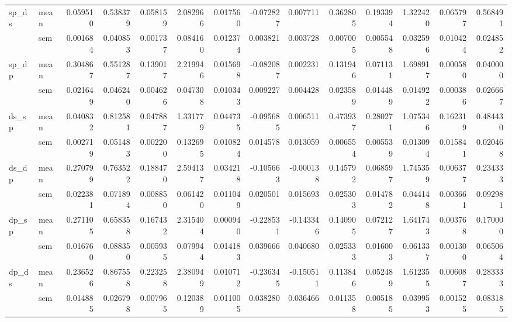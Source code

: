 \begin{tabular}{llrrrrrrrrrrrr}
\cline{1-14}
\multirow[t]{2}{*}{sp_ds} & mean & 0.059510 & 0.538379 & 0.058159 & 2.082966 & 0.017560 & -0.072827 & 0.007711 & 0.362805 & 0.193394 & 1.322420 & 0.065797 & 0.568491 \\
 & sem & 0.001684 & 0.040853 & 0.001737 & 0.084160 & 0.012374 & 0.003821 & 0.003728 & 0.007005 & 0.005548 & 0.032596 & 0.010424 & 0.024852 \\
\cline{1-14}
\multirow[t]{2}{*}{sp_dp} & mean & 0.304867 & 0.551287 & 0.139017 & 2.219946 & 0.015698 & -0.082087 & 0.002231 & 0.131946 & 0.071131 & 1.698917 & 0.000580 & 0.040000 \\
 & sem & 0.021649 & 0.046240 & 0.004626 & 0.047308 & 0.010343 & 0.009227 & 0.004428 & 0.023589 & 0.014489 & 0.014922 & 0.000386 & 0.026667 \\
\cline{1-14}
\multirow[t]{2}{*}{ds_sp} & mean & 0.040832 & 0.812581 & 0.047887 & 1.331779 & 0.044735 & -0.095685 & 0.006511 & 0.473937 & 0.280271 & 1.075346 & 0.162319 & 0.484430 \\
 & sem & 0.002719 & 0.051483 & 0.002200 & 0.132695 & 0.010824 & 0.014578 & 0.013059 & 0.006554 & 0.005539 & 0.013094 & 0.015841 & 0.020468 \\
\cline{1-14}
\multirow[t]{2}{*}{ds_dp} & mean & 0.270799 & 0.763522 & 0.188470 & 2.594137 & 0.034218 & -0.105663 & -0.000138 & 0.145792 & 0.068597 & 1.745359 & 0.006377 & 0.234333 \\
 & sem & 0.022381 & 0.071894 & 0.008850 & 0.061420 & 0.011049 & 0.020501 & 0.015693 & 0.025303 & 0.014782 & 0.044148 & 0.003661 & 0.092981 \\
\cline{1-14}
\multirow[t]{2}{*}{dp_sp} & mean & 0.271105 & 0.658358 & 0.167432 & 2.315404 & 0.000940 & -0.228531 & -0.143346 & 0.140905 & 0.072127 & 1.641743 & 0.003768 & 0.170000 \\
 & sem & 0.016760 & 0.088350 & 0.005935 & 0.079944 & 0.014183 & 0.039666 & 0.040680 & 0.025333 & 0.016003 & 0.061337 & 0.001300 & 0.065064 \\
\cline{1-14}
\multirow[t]{2}{*}{dp_ds} & mean & 0.236526 & 0.867558 & 0.223258 & 2.380949 & 0.010712 & -0.236345 & -0.150511 & 0.113846 & 0.052489 & 1.612355 & 0.006087 & 0.283333 \\
 & sem & 0.014885 & 0.026798 & 0.007965 & 0.120389 & 0.011005 & 0.038280 & 0.036466 & 0.011358 & 0.005185 & 0.039953 & 0.001525 & 0.083185 \\
\cline{1-14}
\bottomrule
\end{tabular}
